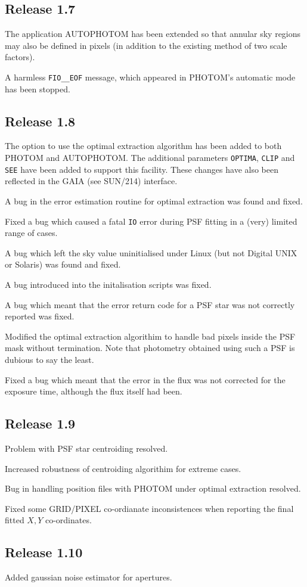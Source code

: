 \documentclass[twoside,11pt]{article}
\newcommand{\htmlref}[2]{#1}
\newcommand{\xref}[3]{#1}
\renewcommand{\_}{\texttt{\symbol{95}}}
\begin{document}
\subsection{Release 1.7}
The application \htmlref{AUTOPHOTOM}{AUTOPHOTOM} has been extended so
that annular sky regions may also be defined in pixels (in addition to
the existing method of two scale factors).

A harmless \verb+FIO__EOF+ message, which appeared in
\htmlref{PHOTOM's}{PHOTOM} automatic mode has been stopped.

\subsection{Release 1.8}
The option to use the optimal extraction algorithm has been added
to both \htmlref{PHOTOM}{PHOTOM} and \htmlref{AUTOPHOTOM}{AUTOPHOTOM}. 
The additional parameters \texttt{OPTIMA}, \texttt{CLIP} and \texttt{SEE} 
have been added to support this facility. These changes have also been 
reflected in the GAIA (see \xref{SUN/214}{sun214}{}) interface.

A bug in the error estimation routine for optimal extraction was found 
and fixed.

Fixed a bug which caused a fatal \verb+IO+ error during PSF fitting in a (very) 
limited range of cases.

A bug which left the sky value uninitialised under Linux (but not Digital UNIX or Solaris) was found and fixed.

A bug introduced into the initalisation scripts was fixed.

A bug which meant that the error return code for a PSF star was not correctly reported was fixed.

Modified the optimal extraction algorithim to handle bad pixels inside the PSF mask without termination. Note that photometry obtained using such a PSF is dubious to say the least.

Fixed a bug which meant that the error in the flux was not corrected for the exposure time, although the flux itself had been.

\subsection{Release 1.9}

Problem with PSF star centroiding resolved.

Increased robustness of centroiding algorithim for extreme cases.

Bug in handling position files with PHOTOM under optimal extraction resolved.

Fixed some GRID/PIXEL co-ordianate inconsistences when reporting the
final fitted $X,Y$ co-ordinates.

\subsection{Release 1.10}

Added gaussian noise estimator for apertures.
\end{document}

